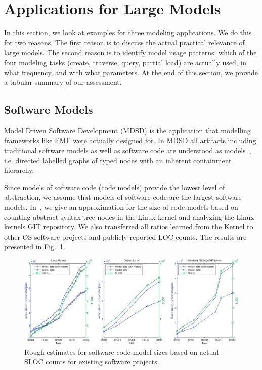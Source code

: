 \section{Applications for Large Models}
\label{sec:applications}

In this section, we look at examples for three modeling applications. We do this for two reasons. The first reason is to discuss the actual practical relevance of large models. The second reason is to identify model usage patterns: which of the four modeling tasks (create, traverse, query, partial load) are actually used, in what frequency, and with what parameters. At the end of this section, we provide a tabular summary of our assessment.

\subsection{Software Models}
Model Driven Software Development (MDSD) is the application that modelling frameworks like EMF were actually designed for. In MDSD all artifacts including traditional software models as well as software code are understood as models~\cite{modelsAsCode}, i.e. directed labelled graphs of typed nodes with an inherent containment hierarchy. 

 Since models of software code (code models) provide the lowest level of abstraction, we assume that models of software code are the largest software models. In~\cite{modelSizes}, we give an approximation for the size of code models based on counting abstract syntax tree nodes in the Linux kernel and analyzing the Linux kernels GIT repository. We also transferred all ratios learned from the Kernel to other OS software projects and publicly reported LOC counts. The results are presented in Fig.~\ref{fig:software_model_sizes}.

\begin{figure}[b]
  \centering
  \includegraphics[width=\linewidth]{figures/software_model_sizes}
  \caption{Rough estimates for software code model sizes based on actual SLOC counts for existing software projects.}
  \label{fig:software_model_sizes}
\end{figure}

